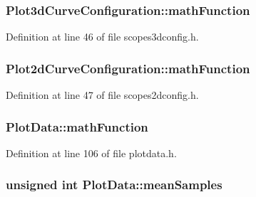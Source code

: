 \hypertarget{group___scope_plugin_ga344f163230a632804af76085d5ed4ae1}{
\subsubsection[{math\-Function}]{ {\bf \-Plot3d\-Curve\-Configuration\-::math\-Function}}}\label{group___scope_plugin_ga344f163230a632804af76085d5ed4ae1}


\-Definition at line 46 of file scopes3dconfig.\-h.

\hypertarget{group___scope_plugin_gac0be9d46aeaed52d3ee1e796946969ed}{
\subsubsection[{math\-Function}]{ {\bf \-Plot2d\-Curve\-Configuration\-::math\-Function}}}\label{group___scope_plugin_gac0be9d46aeaed52d3ee1e796946969ed}


\-Definition at line 47 of file scopes2dconfig.\-h.

\hypertarget{group___scope_plugin_gaa8ea6880a7faa36947144d2df62d6642}{
\subsubsection[{math\-Function}]{ {\bf \-Plot\-Data\-::math\-Function}}}\label{group___scope_plugin_gaa8ea6880a7faa36947144d2df62d6642}


\-Definition at line 106 of file plotdata.\-h.

\hypertarget{group___scope_plugin_ga577111acdda17558321da13bff25a7c0}{
\subsubsection[{mean\-Samples}]{\setlength{\rightskip}{0pt plus 5cm}unsigned int {\bf \-Plot\-Data\-::mean\-Samples}}}\label{group___scope_plugin_ga577111acdda17558321da13bff25a7c0}


